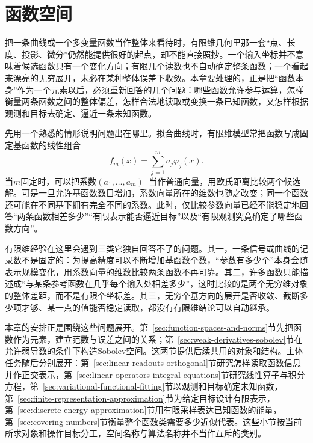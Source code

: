 \chapter{函数空间}
\label{chap:functional-analysis-and-approximation}

\newcommand{\functionalinlinetablecaption}[2]{%
  \refstepcounter{table}\label{#1}%
  \addcontentsline{lot}{table}{\protect\numberline{\thetable}#2}%
  \par\smallskip\noindent
  {\figurefont\footnotesize
   \textcolor{BookTeal}{表~\thetable}\quad #2}\par}
\newcommand{\functionalinlinefigurecaption}[2]{%
  \refstepcounter{figure}\label{#1}%
  \addcontentsline{lof}{figure}{\protect\numberline{\thefigure}#2}%
  \par\smallskip\noindent
  {\figurefont\footnotesize
   \textcolor{BookTeal}{图~\thefigure}\quad #2}\par}

把一条曲线或一个多变量函数当作整体来看待时，有限维几何里那一套“点、长度、投影、微分”仍然能提供很好的起点，却不能直接照抄。一个输入坐标并不意味着候选函数只有一个变化方向；有限几个读数也不自动确定整条函数；一个看起来漂亮的无穷展开，未必在某种整体误差下收敛。本章要处理的，正是把“函数本身”作为一个元素以后，必须重新回答的几个问题：哪些函数允许参与运算，怎样衡量两条函数之间的整体偏差，怎样合法地读取或变换一条已知函数，又怎样根据观测和目标去确定、逼近一条未知函数。

先用一个熟悉的情形说明问题出在哪里。拟合曲线时，有限维模型常把函数写成固定基函数的线性组合
\begin{equation}
  f_m(x)=\sum_{j=1}^{m}a_j\varphi_j(x).
  \label{eq:functional-finite-basis-expansion}
\end{equation}
当$m$固定时，可以把系数$(a_1,\ldots,a_m)^{\top}$当作普通向量，用欧氏距离比较两个候选解。可是一旦允许基函数数目增加，系数向量所在的维数也随之改变；同一个函数还可能在不同基下拥有完全不同的系数。此时，仅比较参数向量已经不能稳定地回答“两条函数相差多少”“有限表示能否逼近目标”以及“有限观测究竟确定了哪些函数方向”。

有限维经验在这里会遇到三类它独自回答不了的问题。其一，一条信号或曲线的记录数不是固定的：为提高精度可以不断增加基函数个数，“参数有多少个”本身会随表示规模变化，用系数向量的维数比较两条函数不再可靠。其二，许多函数只能描述成“与某条参考函数在几乎每个输入处相差多少”，这时比较的是两个无穷维对象的整体差距，而不是有限个坐标差。其三，无穷个基方向的展开是否收敛、截断多少项才够、某一点的值能否稳定读取，都没有有限维结论可以自动继承。

本章的安排正是围绕这些问题展开。第~\ref{sec:function-spaces-and-norms}节先把函数作为元素，建立范数与误差之间的关系；第~\ref{sec:weak-derivatives-sobolev}节在允许弱导数的条件下构造Sobolev空间。这两节提供后续共用的对象和结构。主体任务随后分别展开：第~\ref{sec:linear-readouts-orthogonal}节研究怎样读取函数信息并作正交表示，第~\ref{sec:linear-operators-integral-equations}节研究线性算子与积分方程，第~\ref{sec:variational-functional-fitting}节以观测和目标确定未知函数，第~\ref{sec:finite-representation-approximation}节为给定目标设计有限表示，第~\ref{sec:discrete-energy-approximation}节用有限采样表达已知函数的能量，第~\ref{sec:covering-numbers}节衡量整个函数类需要多少近似代表。这些小节按当前所求对象和操作目标分工，空间名称与算法名称并不当作互斥的类别。

